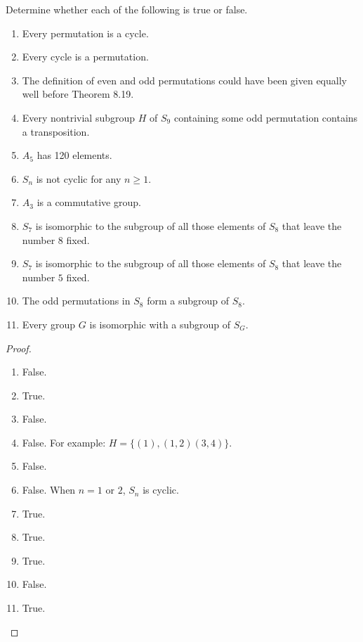 \newpage
\begin{exercise}
    Determine whether each of the following is true or false.
    \begin{enumerate}[label={\textbf{\alph*.}}]
        \item Every permutation is a cycle.
        \item Every cycle is a permutation.
        \item The definition of even and odd permutations could have been given equally well before Theorem 8.19.
        \item Every nontrivial subgroup $H$ of $S_{9}$ containing some odd permutation contains a transposition.
        \item $A_{5}$ has 120 elements.
        \item $S_{n}$ is not cyclic for any $n\geq 1$.
        \item $A_{3}$ is a commutative group.
        \item $S_{7}$ is isomorphic to the subgroup of all those elements of $S_{8}$ that leave the number $8$ fixed.
        \item $S_{7}$ is isomorphic to the subgroup of all those elements of $S_{8}$ that leave the number $5$ fixed.
        \item The odd permutations in $S_{8}$ form a subgroup of $S_{8}$.
        \item Every group $G$ is isomorphic with a subgroup of $S_{G}$.
    \end{enumerate}
\end{exercise}

\begin{proof}
    \begin{enumerate}[label={\textbf{\alph*.}}]
        \item False.
        \item True.
        \item False.
        \item False. For example: $H = \{ (1), (1,2)(3,4) \}$.
        \item False.
        \item False. When $n = 1$ or $2$, $S_{n}$ is cyclic.
        \item True.
        \item True.
        \item True.
        \item False.
        \item True.
    \end{enumerate}
\end{proof}

